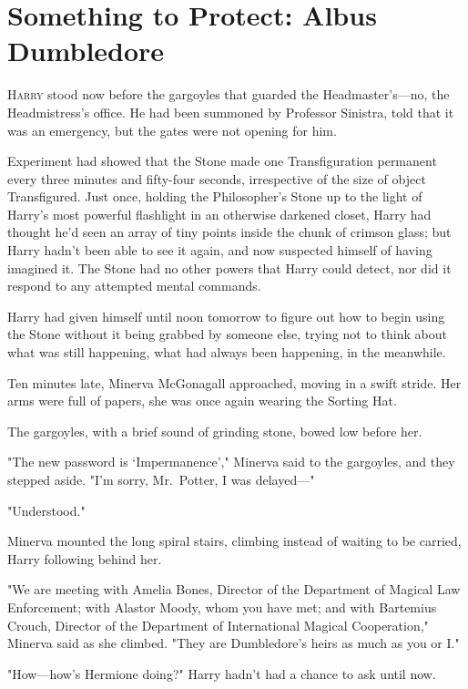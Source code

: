 \chapter{Something to Protect: Albus Dumbledore}

\lettrine{H}{arry} stood now
before the gargoyles that guarded the Headmaster's---no, the Headmistress's
office. He had been summoned by Professor Sinistra, told that it was an
emergency, but the gates were not opening for him.

Experiment had showed that the Stone made one Transfiguration permanent every
three minutes and fifty-four seconds, irrespective of the size of object
Transfigured. Just once, holding the Philosopher's Stone up to the light of
Harry's most powerful flashlight in an otherwise darkened closet, Harry had
thought he'd seen an array of tiny points inside the chunk of crimson glass;
but Harry hadn't been able to see it again, and now suspected himself of having
imagined it. The Stone had no other powers that Harry could detect, nor did it
respond to any attempted mental commands.

Harry had given himself until noon tomorrow to figure out how to begin using
the Stone without it being grabbed by someone else, trying not to think about
what was still happening, what had always been happening, in the meanwhile.

Ten minutes late, Minerva McGonagall approached, moving in a swift stride. Her
arms were full of papers, she was once again wearing the Sorting Hat.

The gargoyles, with a brief sound of grinding stone, bowed low before her.

"The new password is `Impermanence'," Minerva said to the gargoyles, and they
stepped aside. "I'm sorry, Mr.~Potter, I was delayed---"

"Understood."

Minerva mounted the long spiral stairs, climbing instead of waiting to be
carried, Harry following behind her.

"We are meeting with Amelia Bones, Director of the Department of Magical Law
Enforcement; with Alastor Moody, whom you have met; and with Bartemius Crouch,
Director of the Department of International Magical Cooperation," Minerva said
as she climbed. "They are Dumbledore's heirs as much as you or I."

"How---how's Hermione doing?" Harry hadn't had a chance to ask until now.

